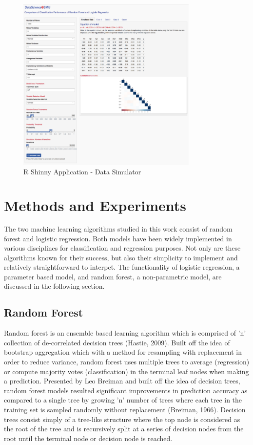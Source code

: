 \documentclass{llncs}
\begin{document}
\begin{figure}
\centering
\includegraphics[width=0.8\textwidth]{rshiny.png}
\caption{R Shinny Application - Data Simulator}
\end{figure}


\section{Methods and Experiments}

The two machine learning algorithms studied in this work consist of random forest and logistic regression. Both models have been widely implemented in various disciplines for classification and regression purposes. Not only are these algorithms known for their success, but also their simplicity to implement and relatively straightforward to interpet. The functionality of logistic regression, a parameter based model, and random forest, a non-parametric model, are discussed in the following section. 

\subsection{Random Forest}


Random forest is an ensemble based learning algorithm which is comprised of 'n' collection of de-correlated decision trees (Hastie, 2009). Built off the idea of bootstrap aggregation which with a method for resampling with replacement in order to reduce variance, random forest uses multiple trees to average (regression) or compute majority votes (classification) in the terminal leaf nodes when making a prediction. Presented by Leo Breiman and built off the idea of decision trees, random forest models resulted significant improvements in prediction accuracy as compared to a single tree by growing 'n' number of trees where each tree in the training set is sampled randomly without replacement (Breiman, 1966). Decision trees consist simply of a tree-like structure where the top node is considered as the root of the tree and is recursively split at a series of decision nodes from the root until the terminal node or decision node is reached. 
\end{document}
